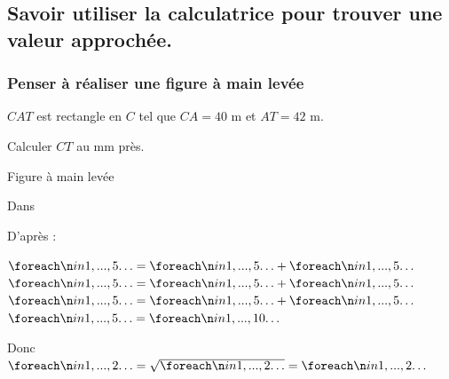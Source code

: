\documentclass[a4paper]{book}
\begin{document}
\subsection{Savoir utiliser la calculatrice pour trouver une valeur approchée.}
 
    \begin{minipage}{0.48\linewidth}
        \subsubsection{Penser à réaliser une figure à main levée}
        
        $CAT$ est rectangle en $C$ tel que $CA = 40$ m et $AT = 42$ m. 
        
        Calculer $CT$ au mm près.

        \begin{center}
            \small{Figure à main levée}
            
        \end{center}
            
        Dans \points[18]

        \medskip

        D'après \points[18] :

        \medskip

        $\points[5] = \points[5]+\points[5]$ \\
        $\points[5] = \points[5]+\points[5]$ \\
        $\points[5] = \points[5]+\points[5]$ \\
        $\points[5] = \points[10]$ 

        \medskip

        Donc $\points[2]=\sqrt{\points[2]}=\points[2]$

        \vspace{2.5cm}
    \end{minipage}
    \hfill
    \vline
    \hfill
\end{document}

